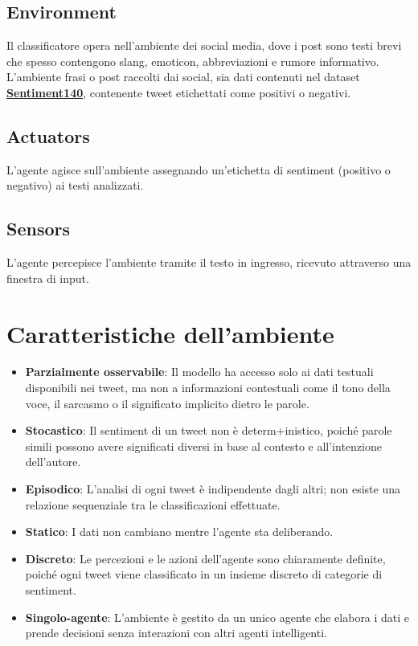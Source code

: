 \documentclass[12pt,a4paper]{report} %
\begin{document}
\subsection{Environment}
Il classificatore opera nell’ambiente dei social media, dove i post sono testi brevi che spesso contengono slang, emoticon, abbreviazioni e rumore informativo. L’ambiente frasi o post raccolti dai social, sia dati contenuti nel dataset \href{https://www.kaggle.com/datasets/kazanova/sentiment140}{\textbf{Sentiment140}}, contenente tweet etichettati come positivi o negativi. 
\subsection{Actuators}
L'agente agisce sull'ambiente assegnando un'etichetta di sentiment (positivo o negativo) ai testi analizzati.
\subsection{Sensors}
L'agente percepisce l'ambiente tramite il testo in ingresso, ricevuto attraverso una finestra di input.

\section{Caratteristiche dell'ambiente}
\begin{itemize}
    \item \textbf{Parzialmente osservabile}: Il modello ha accesso solo ai dati testuali disponibili nei tweet, ma non a informazioni contestuali come il tono della voce, il sarcasmo o il significato implicito dietro le parole.
\end{itemize}
\begin{itemize}
    \item \textbf{Stocastico}: Il sentiment di un tweet non è determ+inistico, poiché parole simili possono avere significati diversi in base al contesto e all'intenzione dell'autore.
\end{itemize}
\begin{itemize}
    \item \textbf{Episodico}: L'analisi di ogni tweet è indipendente dagli altri; non esiste una relazione sequenziale tra le classificazioni effettuate.
\end{itemize}
\begin{itemize}
    \item \textbf{Statico}: I dati non cambiano mentre l'agente sta deliberando.
\end{itemize}
\begin{itemize}
    \item \textbf{Discreto}: Le percezioni e le azioni dell’agente sono chiaramente definite, poiché ogni tweet viene classificato in un insieme discreto di categorie di sentiment.
\end{itemize}
\begin{itemize}
    \item \textbf{Singolo-agente}: L'ambiente è gestito da un unico agente che elabora i dati e prende decisioni senza interazioni con altri agenti intelligenti.
\end{itemize}
\end{document}
